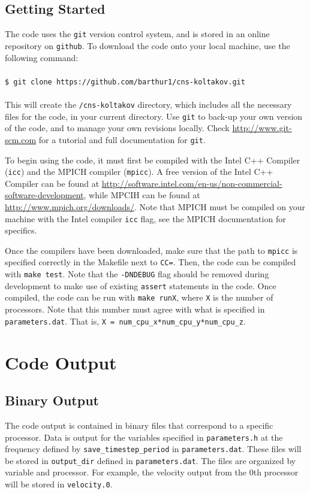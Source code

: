 \documentclass[12pt]{report}
\begin{document}
\section{Getting Started}\label{sec:start}
The code uses the \texttt{git} version control system, and is stored in an online repository on \texttt{github}. To download the code onto your local machine, use the following command:
\\ \\ \texttt{\$ git clone https://github.com/barthur1/cns-koltakov.git}
\\ \\ This will create the \texttt{/cns-koltakov} directory, which includes all the necessary files for the code, in your current directory. Use \texttt{git} to back-up your own version of the code, and to manage your own revisions locally. Check \url{http://www.git-scm.com} for a tutorial and full documentation for \texttt{git}.

To begin using the code, it must first be compiled with the Intel C++ Compiler (\texttt{icc}) and the MPICH compiler (\texttt{mpicc}). A free version of the Intel C++ Compiler can be found at \url{http://software.intel.com/en-us/non-commercial-software-development}, while MPCIH can be found at \url{http://www.mpich.org/downloads/}. Note that MPICH must be compiled on your machine with the Intel compiler \texttt{icc} flag, see the MPICH documentation for specifics.

Once the compilers have been downloaded, make sure that the path to \texttt{mpicc} is specified correctly in the Makefile next to \texttt{CC=}. Then, the code can be compiled with \texttt{make test}. Note that the \texttt{-DNDEBUG} flag should be removed during development to make use of existing \texttt{assert} statements in the code. Once compiled, the code can be run with \texttt{make runX}, where \texttt{X} is the number of processors. Note that this number must agree with what is specified in \texttt{parameters.dat}. That is, \texttt{X = num\_cpu\_x*num\_cpu\_y*num\_cpu\_z}.

 
\chapter{Code Output}

\section{Binary Output}
The code output is contained in binary files that correspond to a specific processor. 
Data is output for the variables specified in \texttt{parameters.h} at the frequency 
defined by \texttt{save\_timestep\_period} in \texttt{parameters.dat}. These files will be stored in \texttt{output\_dir} defined in \texttt{parameters.dat}. The files are organized by variable and processor. For example, the velocity output from the 0th processor will be stored in \texttt{velocity.0}.
\end{document}
